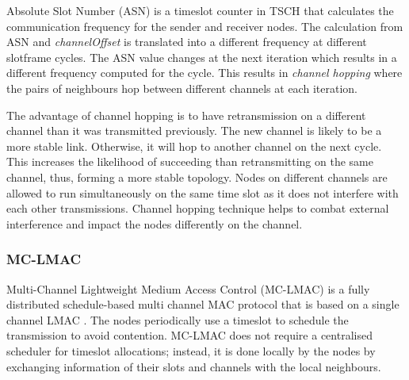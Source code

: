 Absolute Slot Number (ASN) is a timeslot counter in TSCH that calculates the communication frequency for the sender and receiver nodes. The calculation from ASN and \textit{channelOffset} is translated into a different frequency at different slotframe cycles. The ASN value changes at the next iteration which results in a different frequency computed for the cycle. This results in \textit{channel hopping} where the pairs of neighbours hop between different channels at each iteration.

The advantage of channel hopping is to have retransmission on a different channel than it was transmitted previously. The new channel is likely to be a more stable link. Otherwise, it will hop to another channel on the next cycle. This increases the likelihood of succeeding than retransmitting on the same channel, thus, forming a more stable topology. Nodes on different channels are allowed to run simultaneously on the same time slot as it does not interfere with each other transmissions. Channel hopping technique helps to combat external interference and impact the nodes differently on the channel.




\subsubsection{MC-LMAC}
Multi-Channel Lightweight Medium Access Control (MC-LMAC) is a fully distributed schedule-based multi channel MAC protocol that is based on a single channel LMAC \cite{lmac}. The nodes periodically use a timeslot to schedule the transmission to avoid contention. MC-LMAC does not require a centralised scheduler for timeslot allocations; instead, it is done locally by the nodes by exchanging information of their slots and channels with the local neighbours. 


